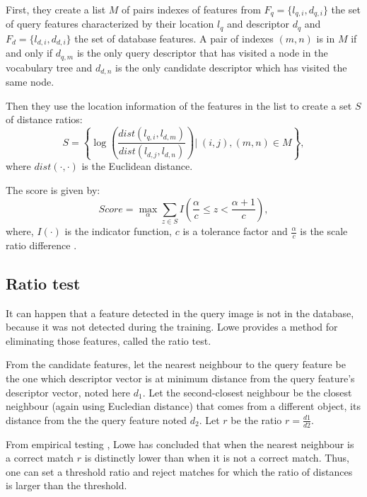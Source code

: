 First, they create a list $M$ of pairs indexes of features from $F_q = \{ l_{q,i}, d_{q,i}\}$ the set of query features characterized by their location $l_q$ and descriptor $d_q$ and $F_d = \{ l_{d,i}, d_{d,i}\}$ the set of database features. A pair of indexes $(m,n)$ is in $M$ if and only if $d_{q,m}$ is the only query descriptor that has visited a node in the vocabulary tree and $d_{d,n}$ is the only candidate descriptor which has visited the same node.

Then they use the location information of the features in the list to create a set $S$ of distance ratios:
\begin{equation}
    S = \left\{ \log \left( \frac{dist(l_{q,i},l_{d,m})}{dist(l_{d,j},l_{d,n})} \right) \big| \; (i,j),(m,n) \in M \right\},
\end{equation}
where $dist(\cdot,\cdot)$ is the Euclidean distance.

The score is given by:
\begin{equation}
    Score = \underset{\alpha}{\max} \sum_{z \in S} I\left( \frac{\alpha}{c} \leq z < \frac{\alpha + 1}{c} \right),
\end{equation}
where, $I(\cdot)$ is the indicator function, $c$ is a tolerance factor and $\frac{\alpha}{c}$ is the scale ratio difference \cite{tsai2010fast}.

\subsection{Ratio test}

It can happen that a feature detected in the query image is not in the database, because it was not detected during the training. Lowe \cite{Lowe04distinctiveimage} provides a method for eliminating those features, called the ratio test.

From the candidate features, let the nearest neighbour to the query feature be the one which descriptor vector is at minimum distance from the query feature's descriptor vector, noted here $d_1$. Let the second-closest neighbour be the closest neighbour (again using Eucledian distance) that comes from a different object, its distance from the the query feature noted $d_2$. Let $r$ be the ratio $r = \frac{d1}{d2}$.

From empirical testing \cite{Lowe04distinctiveimage}, Lowe has concluded that when the nearest neighbour is a correct match $r$ is distinctly lower than when it is not a correct match. Thus, one can set a threshold ratio and reject matches for which the ratio of distances is larger than the threshold.


